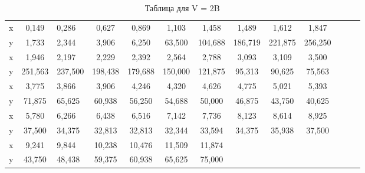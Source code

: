 \documentclass[14pt,a4paper]{scrartcl}
\begin{document}
		\begin{table}[h!]
		\caption{Таблица для V = 2B}
		\begin{center}
			\begin{tabular}{|c|c|p{15mm}|c|c|c|c|c|c|c|c|c|c|}
				\hline 
			x& 0,149 & 0,286 & 0,627 & 0,869 & 1,103 & 1,458 & 1,489 & 1,612 & 1,847 \\ 
			y & 1,733 & 2,344 & 3,906 & 6,250 & 63,500 & 104,688 & 186,719 & 221,875 & 256,250  \\ \hline
			x & 1,946 & 2,197 & 2,229 & 2,392 & 2,564 & 2,788 & 3,093 & 3,109 & 3,500  \\ 
			y & 251,563 & 237,500 & 198,438 & 179,688 & 150,000 & 121,875 & 95,313 & 90,625 & 75,563  \\ \hline
			x & 3,775 & 3,866 & 3,906 & 4,246 & 4,320 & 4,626 & 4,775 & 5,021 & 5,393  \\
			y & 71,875 & 65,625 & 60,938 & 56,250 & 54,688 & 50,000 & 46,875 & 43,750 & 40,625  \\\hline
			x & 5,780 & 6,266 & 6,438 & 6,516 & 7,142 & 7,736 & 8,123 & 8,614 & 8,925  \\
			y & 37,500 & 34,375 & 32,813 & 32,813 & 32,344 & 33,594 & 34,375 & 35,938 & 37,500  \\\hline
			x & 9,241 & 9,844 & 10,238 & 10,476 & 11,509 & 11,874 &  &  &   \\
			y & 43,750 & 48,438 & 59,375 & 60,938 & 65,625 & 75,000 &  &  &   \\
				\hline 
			\end{tabular} 
		\end{center}
		\label{table_mn}
	\end{table}
\end{document}
